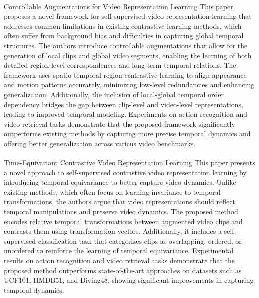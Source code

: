 \documentclass[11pt,a4paper]{report}
\begin{document}
\paragraph{} Controllable Augmentations for Video Representation Learning
This paper proposes a novel framework for self-supervised video representation learning that addresses common limitations in existing contrastive learning methods, which often suffer from background bias and difficulties in capturing global temporal structures. The authors introduce controllable augmentations that allow for the generation of local clips and global video segments, enabling the learning of both detailed region-level correspondences and long-term temporal relations. The framework uses spatio-temporal region contrastive learning to align appearance and motion patterns accurately, minimizing low-level redundancies and enhancing generalization. Additionally, the inclusion of local-global temporal order dependency bridges the gap between clip-level and video-level representations, leading to improved temporal modeling. Experiments on action recognition and video retrieval tasks demonstrate that the proposed framework significantly outperforms existing methods by capturing more precise temporal dynamics and offering better generalization across various video benchmarks.

\paragraph{} Time-Equivariant Contrastive Video Representation Learning
This paper presents a novel approach to self-supervised contrastive video representation learning by introducing temporal equivariance to better capture video dynamics. Unlike existing methods, which often focus on learning invariance to temporal transformations, the authors argue that video representations should reflect temporal manipulations and preserve video dynamics. The proposed method encodes relative temporal transformations between augmented video clips and contrasts them using transformation vectors. Additionally, it includes a self-supervised classification task that categorizes clips as overlapping, ordered, or unordered to reinforce the learning of temporal equivariance. Experimental results on action recognition and video retrieval tasks demonstrate that the proposed method outperforms state-of-the-art approaches on datasets such as UCF101, HMDB51, and Diving48, showing significant improvements in capturing temporal dynamics.
\end{document}

